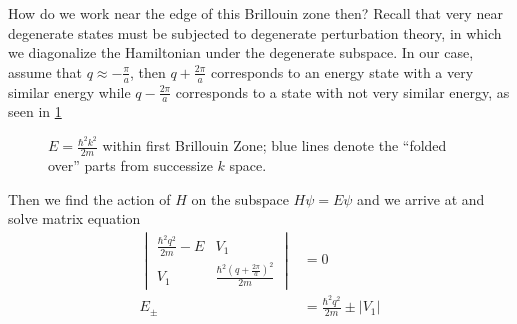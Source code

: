 \documentclass[10pt]{report}
\newcommand{\abs}[1]{\left|#1\right|}
\begin{document}
How do we work near the edge of this Brillouin zone then? Recall that very near degenerate states must be subjected to degenerate perturbation theory, in which we diagonalize the Hamiltonian under the degenerate subspace. In our case, assume that $q \approx -\frac{\pi}{a}$, then $q + \frac{2\pi}{a}$ corresponds to an energy state with a very similar energy while $q - \frac{2\pi}{a}$ corresponds to a state with not very similar energy, as seen in \ref{17.9.parabola}
\begin{figure}[!h]
    \centering
    \caption{$E = \frac{\hbar^2 k^2}{2m}$ within first Brillouin Zone; blue lines denote the ``folded over'' parts from successize $k$ space.}
    \label{17.9.parabola}
\end{figure}

Then we find the action of $H$ on the subspace $H\psi = E\psi$ and we arrive at and solve matrix equation
\begin{align}
    \begin{vmatrix}\frac{\hbar^2 q^2}{2m} - E & V_1 \\ V_1 & \frac{\hbar^2 \left( q + \frac{2\pi}{a} \right)^2}{2m} \end{vmatrix} &= 0\\
    E_{\pm} &= \frac{\hbar^2 q^2}{2m} \pm \abs{V_1}
\end{align}
\end{document}

